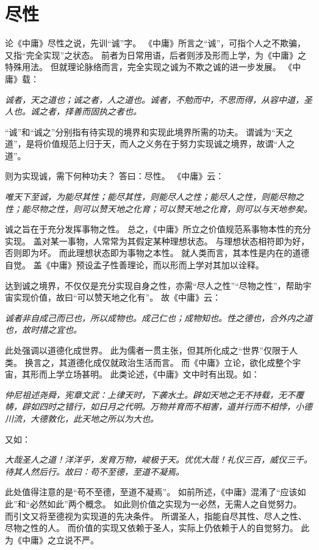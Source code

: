 \documentclass[11pt]{article}
\begin{document}
\section{尽性}
论《中庸》尽性之说，先训“诚”字。
《中庸》所言之“诚”，可指个人之不欺骗，又指“完全实现”之状态。
前者为日常用语，后者则涉及形而上学，为《中庸》之特殊用法。
但就理论脉络而言，完全实现之诚为不欺之诚的进一步发展。
《中庸》载：

\textit{诚者，天之道也；诚之者，人之道也。诚者，不勉而中，不思而得，从容中道，圣人也。诚之者，择善而固执之者也。}

“诚”和“诚之”分别指有待实现的境界和实现此境界所需的功夫。
谓诚为“天之道”，是将价值规范上归于天，而人之义务在于努力实现诚之境界，故谓“人之道”。

\par

则为实现诚，需下何种功夫？
答曰：尽性。
《中庸》云：

\textit{唯天下至诚，为能尽其性；能尽其性，则能尽人之性；能尽人之性，则能尽物之性；能尽物之性，则可以赞天地之化育；可以赞天地之化育，则可以与天地参矣。}

诚之旨在于充分发挥事物之性。
总之，《中庸》所立之价值规范系事物本性的充分实现。
盖对某一事物，人常常为其假定某种理想状态。
与理想状态相符即为好，否则即为坏。
而此理想状态即为事物之本性。
就人类而言，其本性是内在的道德自觉。
盖《中庸》预设孟子性善理论，而以形而上学对其加以诠释。

\par

达到诚之境界，不仅仅是充分实现自身之性，亦需“尽人之性”“尽物之性”，帮助宇宙实现价值，故曰“可以赞天地之化有”。
故《中庸》云：

\textit{诚者非自成己而已也，所以成物也。成己仁也；成物知也。性之德也，合外内之道也，故时措之宜也。}

此处强调以道德化成世界。
此为儒者一贯主张，但其所化成之“世界”仅限于人类。
换言之，其道德化成仅就政治生活而言。
而《中庸》立论，欲化成整个宇宙，其形而上学立场甚明。
此类论述，《中庸》文中时有出现。如：

\textit{仲尼祖述尧舜，宪章文武：上律天时，下袭水土。辟如天地之无不持载，无不覆帱，辟如四时之错行，如日月之代明。万物并育而不相害，道并行而不相悖，小德川流，大德敦化，此天地之所以为大也。}

又如：

\textit{大哉圣人之道！洋洋乎，发育万物，峻极于天。优优大哉！礼仪三百，威仪三千。待其人然后行。故曰：苟不至德，至道不凝焉。}

此处值得注意的是“苟不至德，至道不凝焉”。
如前所述，《中庸》混淆了“应该如此”和“必然如此”两个概念。
如此则价值之实现为一必然，无需人之自觉努力。
而引文又将至德视为实现道的先决条件。
所谓圣人，指能自尽其性、尽人之性、尽物之性的人。
而价值的实现又依赖于圣人，实际上仍依赖于人的自觉努力。
此为《中庸》之立说不严。
  
\end{document}
